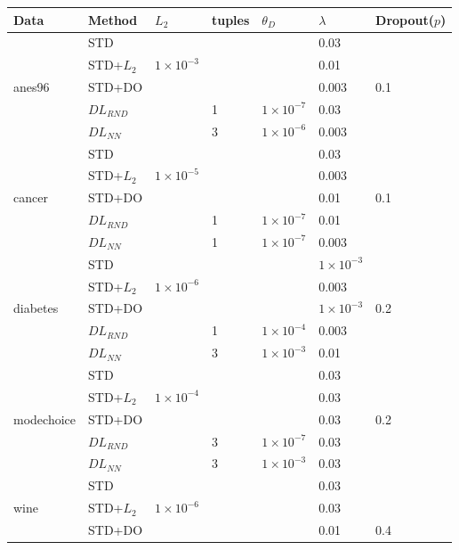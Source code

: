 \documentclass{article}
\begin{document}
\begin{table}[tb]
  \begin{center}
  \begin{small}
  \begin{sc}
  
  \begin{tabular}{lllllll}
  \toprule
  Data & Method & $L_2$ & tuples & $\theta_{D}$ & $\lambda$ & Dropout($p$) \\

  \midrule
\multirow{5}{*}{anes96}  & STD  & && & 0.03 &  \\
 & STD+$L_2$& $1 \times 10^{-3}$ & & & 0.01 &  \\
 & STD+DO & &&& 0.003 & 0.1  \\
 & $DL_{RND}$ & & 1  & $1	\times 10^{-7}$ & 0.03 & \\
 & $DL_{NN}$ & & 3  & $1 	\times 10^{-6}$ & 0.003 & \\ \cline{2-7}
\multirow{5}{*}{cancer}  & STD  & & && 0.03 & \\
 & STD+$L_2$& $1 \times 10^{-5}$ & && 0.003 & \\
 & STD+DO & & & & 0.01 & 0.1  \\
 & $DL_{RND}$ & & 1  & $1	\times 10^{-7}$ & 0.01 & \\
 & $DL_{NN}$ & & 1  & $1	\times 10^{-7}$ & 0.003 & \\\cline{2-7}
\multirow{5}{*}{diabetes} & STD  & & & & $1 \times 10^{-3}$ & \\
 & STD+$L_2$ & $1 	\times 10^{-6}$ & & & 0.003 & \\
 & STD+DO & & & & $1 \times 10^{-3}$ & 0.2  \\
 & $DL_{RND}$ & & 1  & $1 \times 10^{-4}$ & 0.003 & \\
 & $DL_{NN}$ & & 3  & $1 \times 10^{-3}$ & 0.01 & \\\cline{2-7}
\multirow{5}{*}{modechoice} & STD  & & & & 0.03 & \\
 & STD+$L_2$ & $1 \times 10^{-4}$ & & & 0.03 & \\
 & STD+DO & & & & 0.03 & 0.2  \\
 & $DL_{RND}$ & & 3  & $1	\times 10^{-7}$ & 0.03 & \\
 & $DL_{NN}$ & & 3  & $1 \times 10^{-3}$ & 0.03 & \\\cline{2-7}
\multirow{5}{*}{wine} & STD  & & & & 0.03 & \\
 & STD+$L_2$ & $1 	\times 10^{-6}$ & & & 0.03 & \\
 & STD+DO & & & & 0.01 & 0.4  \\

\end{tabular}
\end{sc}
\end{small}
\end{center}
\end{table}
\end{document}
